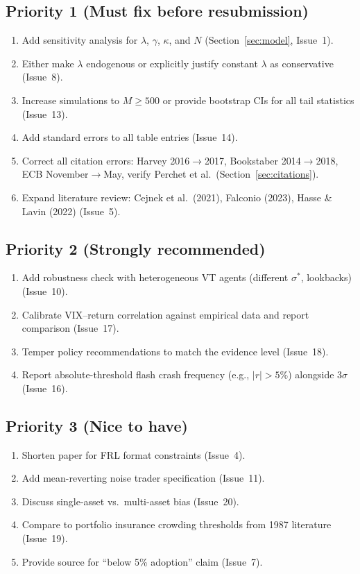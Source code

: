 \documentclass[12pt,a4paper]{article}
\begin{document}
\subsection*{Priority 1 (Must fix before resubmission)}
\begin{enumerate}
  \item Add sensitivity analysis for $\lambda$, $\gamma$, $\kappa$, and $N$ (Section~\ref{sec:model}, Issue~1).
  \item Either make $\lambda$ endogenous or explicitly justify constant $\lambda$ as conservative (Issue~8).
  \item Increase simulations to $M \geq 500$ or provide bootstrap CIs for all tail statistics (Issue~13).
  \item Add standard errors to all table entries (Issue~14).
  \item Correct all citation errors: Harvey 2016$\to$2017, Bookstaber 2014$\to$2018, ECB November$\to$May, verify Perchet et al.\ (Section~\ref{sec:citations}).
  \item Expand literature review: Cejnek et al.\ (2021), Falconio (2023), Hasse \& Lavin (2022) (Issue~5).
\end{enumerate}

\subsection*{Priority 2 (Strongly recommended)}
\begin{enumerate}[resume]
  \item Add robustness check with heterogeneous VT agents (different $\sigma^*$, lookbacks) (Issue~10).
  \item Calibrate VIX--return correlation against empirical data and report comparison (Issue~17).
  \item Temper policy recommendations to match the evidence level (Issue~18).
  \item Report absolute-threshold flash crash frequency (e.g., $|r| > 5\%$) alongside $3\sigma$ (Issue~16).
\end{enumerate}

\subsection*{Priority 3 (Nice to have)}
\begin{enumerate}[resume]
  \item Shorten paper for FRL format constraints (Issue~4).
  \item Add mean-reverting noise trader specification (Issue~11).
  \item Discuss single-asset vs.\ multi-asset bias (Issue~20).
  \item Compare to portfolio insurance crowding thresholds from 1987 literature (Issue~19).
  \item Provide source for ``below 5\% adoption'' claim (Issue~7).
\end{enumerate}
\end{document}
